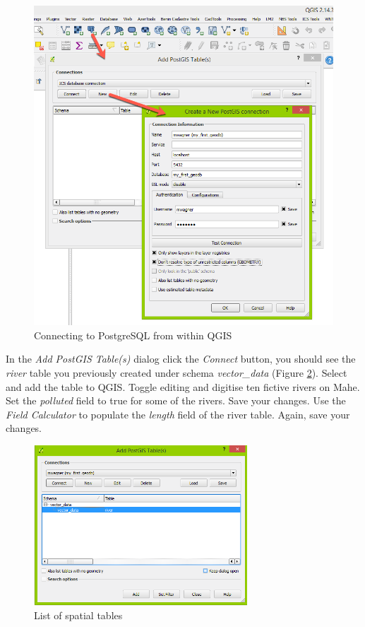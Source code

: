 \documentclass[a4paper,12pt,titlepage]{article}
\begin{document}
\begin{figure}[htb]
	\centering
	\includegraphics[width=12cm]{Images/postgis_conn.png}
	\caption{Connecting to PostgreSQL from within QGIS}\label{fig:postgis_conn}
\end{figure}

In the \textit{Add PostGIS Table(s)} dialog click the \textit{Connect} button, you should see the \textit{river} table you previously created under schema \textit{vector\_data} (Figure \ref{fig:postgis_conn2}). Select and add the table to QGIS. Toggle editing and digitise ten fictive rivers on Mahe. Set the \textit{polluted} field to true for some of the rivers. Save your changes. Use the \textit{Field Calculator} to populate the \textit{length} field of the river table. Again, save your changes.

\begin{figure}[htb]
	\centering
	\includegraphics[width=8cm]{Images/postgis_conn2.png}
	\caption{List of spatial tables}\label{fig:postgis_conn2}
\end{figure}
\end{document}
